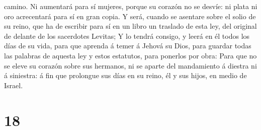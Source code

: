 camino.  Ni aumentará para sí mujeres, porque su corazón
no se desvíe: ni plata ni oro acrecentará para sí en gran copia.
 Y será, cuando se asentare sobre el solio de su reino,
que ha de escribir para sí en un libro un traslado de esta ley, del
original de delante de los sacerdotes Levitas;  Y lo
tendrá consigo, y leerá en él todos los días de su vida, para que
aprenda á temer á Jehová su Dios, para guardar todas las palabras de
aquesta ley y estos estatutos, para ponerlos por obra: 
Para que no se eleve su corazón sobre sus hermanos, ni se aparte del
mandamiento á diestra ni á siniestra: á fin que prolongue sus días en su
reino, él y sus hijos, en medio de Israel.

\hypertarget{section-17}{%
\section{18}\label{section-17}}

